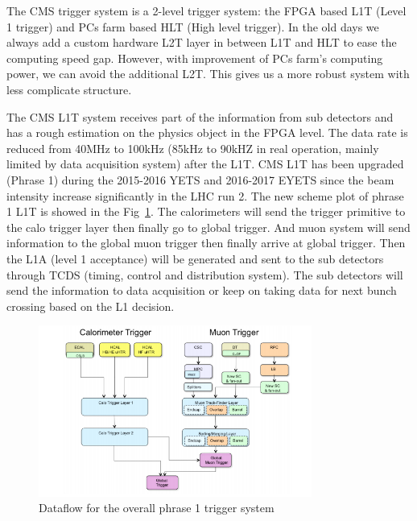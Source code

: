 The CMS trigger system is a 2-level trigger system: the FPGA based L1T (Level 1 trigger) and PCs farm based HLT (High level trigger). In the old days we always add a custom hardware L2T layer in between L1T and HLT to ease the computing speed gap. However, with improvement of PCs farm’s computing power, we can avoid the additional L2T. This gives us a more robust system with less complicate structure. 

The CMS L1T system receives part of the information from sub detectors and has a rough estimation on the physics object in the FPGA level. The data rate is reduced from 40MHz to 100kHz (85kHz to 90kHZ in real operation, mainly limited by data acquisition system) after the L1T. CMS L1T has been upgraded (Phrase 1) during the 2015-2016 YETS and 2016-2017 EYETS since the beam intensity increase significantly in the LHC run 2. The new scheme plot of phrase 1 L1T is showed in the Fig~\ref{fig:c3cmsl1scheme}. The calorimeters will send the trigger primitive to the calo trigger layer then finally go to global trigger. And muon system will send information to the global muon trigger then finally arrive at global trigger. Then the L1A (level 1 acceptance) will be generated and sent to the sub detectors through TCDS (timing, control and distribution system). The sub detectors will send the information to data acquisition or keep on taking data for next bunch crossing based on the L1 decision. 

\begin{figure}[htbp]
 \begin{center}
  \includegraphics[width=0.8\textwidth]{figures/c3/c3_cms_l1scheme.png}
 \end{center}
 \caption{Dataflow for the overall phrase 1 trigger system}
 \label{fig:c3cmsl1scheme}
\end{figure}

